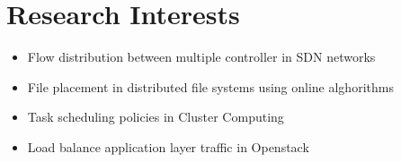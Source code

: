 \documentclass[a4paper,10pt]{article} %
\begin{document}
\color{blue}
\section{Research Interests}
\color{Black}
\begin{itemize}
	\item Flow distribution between multiple controller in SDN networks
	\item File placement in distributed file systems using online alghorithms
	\item Task scheduling policies in Cluster Computing
	\item Load balance application layer traffic in Openstack
					
	
		
	\end{itemize}
\end{document}
